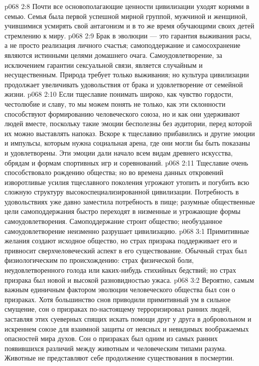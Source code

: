 \vs p068 2:8 Почти все основополагающие ценности цивилизации уходят корнями в семью. Семья была первой успешной мирной группой, мужчиной и женщиной, учившимися усмирять свой антагонизм и в то же время обучающими своих детей стремлению к миру.
\vs p068 2:9 Брак в эволюции --- это гарантия выживания расы, а не просто реализация личного счастья; самоподдержание и самосохранение являются истинными целями домашнего очага. Самоудовлетворение, за исключением гарантии сексуальной связи, является случайным и несущественным. Природа требует только выживания; но культура цивилизации продолжает увеличивать удовольствия от брака и удовлетворение от семейной жизни.
\vs p068 2:10 \pc Если тщеславие понимать широко, как чувство гордости, честолюбие и славу, то мы можем понять не только, как эти склонности способствуют формированию человеческого союза, но и как они удерживают людей вместе, поскольку такие эмоции бесполезны без аудитории, перед которой их можно выставлять напоказ. Вскоре к тщеславию прибавились и другие эмоции и импульсы, которым нужна социальная арена, где они могли бы быть показаны и удовлетворены. Эти эмоции дали начало всем видам древнего искусства, обрядам и формам спортивных игр и соревнований.
\vs p068 2:11 Тщеславие очень способствовало рождению общества; но во времена данных откровений изворотливые усилия тщеславного поколения угрожают утопить и погубить всю сложную структуру высокоспециализированной цивилизации. Потребность в удовольствиях уже давно заместила потребность в пище; разумные общественные цели самоподдержания быстро переходят в низменные и угрожающие формы самоудовлетворения. Самоподдержание строит общество; необузданное самоудовлетворение неизменно разрушает цивилизацию.
\vs p068 3:1 Примитивные желания создают исходное общество, но страх призрака поддерживает его и привносит сверхчеловеческий аспект в его существование. Обычный страх был физиологическим по происхождению: страх физической боли, неудовлетворенного голода или каких\hyp{}нибудь стихийных бедствий; но страх призрака был новой и высокой разновидностью ужаса.
\vs p068 3:2 Вероятно, самым важным единичным фактором эволюции человеческого общества был сон о призраках. Хотя большинство снов приводили примитивный ум в сильное смущение, сон о призраках по\hyp{}настоящему терроризировал ранних людей, заставляя этих суеверных спящих искать помощи друг у друга в добровольном и искреннем союзе для взаимной защиты от неясных и невидимых воображаемых опасностей мира духов. Сон о призраках был одним из самых ранних появившихся различий между животным и человеческим типами разума. Животные не представляют себе продолжение существования в посмертии.
